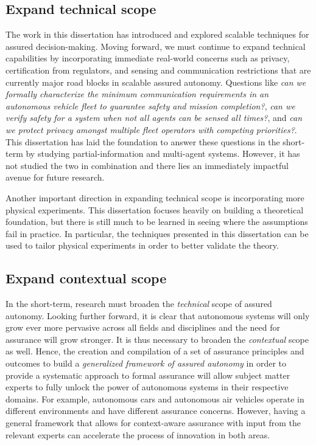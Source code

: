 \subsection{Expand technical scope}
The work in this dissertation has introduced and explored scalable techniques for assured decision-making. Moving forward, we must continue to expand technical capabilities by incorporating immediate real-world concerns such as privacy, certification from regulators, and sensing and communication restrictions that are currently major road blocks in scalable assured autonomy. Questions like \emph{can we formally characterize the minimum communication requirements in an autonomous vehicle fleet to guarantee safety and mission completion?}, \emph{can we verify safety for a system when not all agents can be sensed all times?}, and \emph{can we protect privacy amongst multiple fleet operators with competing priorities?}. This dissertation has laid the foundation to answer these questions in the short-term by studying partial-information and multi-agent systems. However, it has not studied the two in combination and there lies an immediately impactful avenue for future research. 

Another important direction in expanding technical scope is incorporating more physical experiments. This dissertation focuses heavily on building a theoretical foundation, but there is still much to be learned in seeing where the assumptions fail in practice. In particular, the techniques presented in this dissertation can be used to tailor physical experiments in order to better validate the theory. 

\subsection{Expand contextual scope}
In the short-term, research must broaden the \emph{technical} scope of assured autonomy. Looking further forward, it is clear that autonomous systems will only grow ever more pervasive across all fields and disciplines and the need for assurance will grow stronger. It is thus necessary to broaden the \emph{contextual} scope as well.  Hence, the creation and compilation of a set of assurance principles and outcomes to build a \emph{generalized framework of assured autonomy} in order to provide a systematic approach to formal assurance will allow subject matter experts to fully unlock the power of autonomous systems in their respective domains. For example, autonomous cars and autonomous air vehicles operate in different environments and have different assurance concerns. However, having a general framework that allows for context-aware assurance with input from the relevant experts can accelerate the process of innovation in both areas. 

